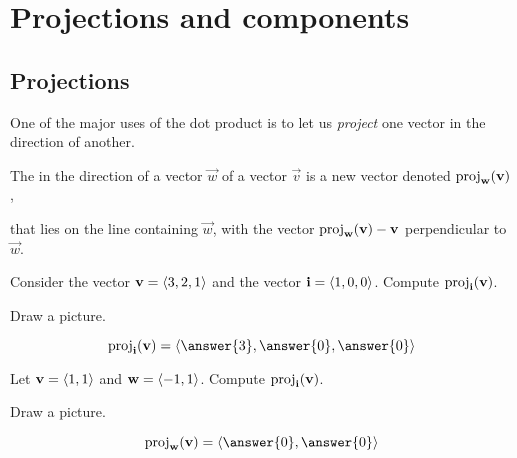 \documentclass{ximera}
\begin{document}
\section{Projections and components}

\subsection{Projections}
One of the major uses of the dot product is to let us \textit{project}
one vector in the direction of another.

\begin{definition}
  The  in the direction of a vector $\vec{w}$ of a
  vector $\vec{v}$ is a new vector denoted $\operatorname{proj}_\mathbf{w}(\mathbf{v})$,
  \begin{image}
    \qquad
  \end{image}
  that lies on the line containing $\vec{w}$, with the vector
  $\operatorname{proj}_\mathbf{w}(\mathbf{v}) - \mathbf{v}$ perpendicular to $\vec{w}$.
\end{definition}

\begin{question}
  Consider the vector $\mathbf{v}=\left\langle 3,2,1\right\rangle$ and the vector $\mathbf{i} =
  \left\langle 1,0,0\right\rangle$.  Compute $\operatorname{proj}_{\mathbf{i}}(\mathbf{v})$.
  \begin{hint}
    Draw a picture.
  \end{hint}
  \begin{prompt}
    \[
    \proj_\veci(\vec{v}) = \vector{\answer{3},\answer{0},\answer{0}}
    \]
  \end{prompt}
  \begin{question}
    Let $\mathbf{v} = \left\langle 1,1\right\rangle$ and $\mathbf{w}=\left\langle -1,1\right\rangle$. Compute
    $\operatorname{proj}_{\mathbf{i}}(\mathbf{v})$.
    \begin{hint}
      Draw a picture.
    \end{hint}
      \begin{prompt}
        \[
        \proj_\vec{w}(\vec{v}) = \vector{\answer{0},\answer{0}}
        \]
      \end{prompt}
  \end{question}
\end{question}
\end{document}
